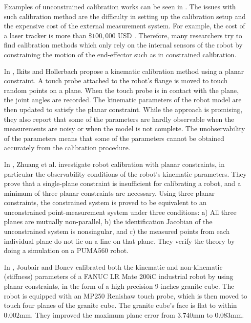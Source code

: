 Examples of unconstrained calibration works can be seen in . The issues with such calibration method are the difficulty in setting up the calibration setup and the expensive cost of the external measurement system. For example, the cost of a laser tracker is more than $\$100,000$ USD \cite{Nubiola2013}. Therefore, many researchers try to find calibration methods which only rely on the internal sensors of the robot by constraining the motion of the end-effector such as in constrained calibration. 

In \cite{Ikits1997}, Ikits and Hollerbach propose a kinematic calibration method using a planar constraint. A touch probe attached to the robot's flange is moved to touch random points on a plane. When the touch probe is in contact with the plane, the joint angles are recorded. The kinematic parameters of the robot model are then updated to satisfy the planar constraint. While the approach is promising, they also report that some of the parameters are hardly observable when the measurements are noisy or when the model is not complete. The unobservability of the parameters means that some of the parameters cannot be obtained accurately from the calibration procedure.

In \cite{Zhuang1999}, Zhuang et al. investigate robot calibration with planar constraints, in particular the observability conditions of the robot's kinematic parameters. They prove that a single-plane constraint is insufficient for calibrating a robot, and a minimum of three planar constraints are necessary. Using three planar constraints, the constrained system is proved to be equivalent to an unconstrained point-measurement system under three conditions: a) All three planes are mutually non-parallel, b) the identification Jacobian of the unconstrained system is nonsingular, and c) the measured points from each individual plane do not lie on a line on that plane. They verify the theory by doing a simulation on a PUMA560 robot. 

In \cite{Joubair2015}, Joubair and Bonev calibrated both the kinematic and non-kinematic (stiffness) parameters of a FANUC LR Mate 200iC industrial robot by using planar constraints, in the form of a high precision 9-inches granite cube. The robot is equipped with an MP250 Renishaw touch probe, which is then moved to touch four planes of the granite cube. The granite cube's face is flat to within 0.002mm. They improved the maximum plane error from 3.740mm to 0.083mm. 

